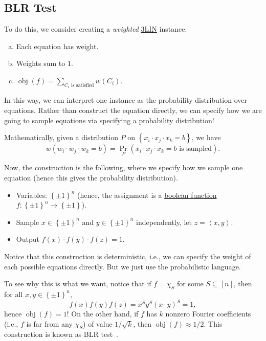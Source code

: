 \subsection{BLR Test}
To do this, we consider creating a \emph{weighted} \hyperref[prb:max-3LIN]{3LIN} instance.
\begin{enumerate}[(a)]
	\item Each equation has weight.
	\item Weights sum to \(1\).
	\item \(\mathop{\mathrm{obj}}(f) = \sum_{C_i \text{ is satisfied}} w(C_i)\).
\end{enumerate}
In this way, we can interpret one instance as the probability distribution over equations. Rather than construct the equation directly, we can specify how we are going to sample equations via specifying a probability distribution!

\begin{remark}
	Mathematically, given a distribution \(P\) on \(\left\{ x_i\cdot x_j \cdot x_k = b \right\} \), we have
	\[
		w(w_{i} \cdot w_{j} \cdot w_{k} = b) = \Pr_{P}(\text{\(x_i \cdot x_j \cdot x_k = b\) is sampled} ).
	\]
\end{remark}

Now, the construction is the following, where we specify how we sample one equation (hence this gives the probability distribution).
\begin{itemize}
	\item Variables: \(\left\{ \pm 1 \right\} ^n\) (hence, the assignment is a \hyperref[def:boolean-function]{boolean function} \(f\colon \left\{ \pm 1 \right\} ^n \to  \left\{ \pm 1 \right\} \)).
	\item Sample \(x\in \left\{ \pm 1 \right\} ^n\) and \(y\in \left\{ \pm 1 \right\} ^n\) independently, let \(z = \left\langle x, y \right\rangle \).
	\item Output \(f(x) \cdot f(y)\cdot f(z) = 1\).
\end{itemize}

\begin{note}
	Notice that this construction is deterministic, i.e., we can specify the weight of each possible equations directly. But we just use the probabilistic language.
\end{note}

To see why this is what we want, notice that if \(f = \chi _S\) for some \(S \subseteq [n]\), then for all \(x, y\in \left\{ \pm 1 \right\} ^n\),
\[
	f(x) f(y) f(z) = x^S y^S (x\cdot y)^S = 1,
\]
hence \(\mathop{\mathrm{obj}}(f) = 1\)! On the other hand, if \(f\) has \(k\) nonzero Fourier coefficients (i.e., \(f\) is far from any \(\chi _S\)) of value \(1 / \sqrt{k} \), then \(\mathop{\mathrm{obj}}(f) \approx 1 / 2\). This construction is known as BLR test~\cite{10.1145/100216.100225}.

